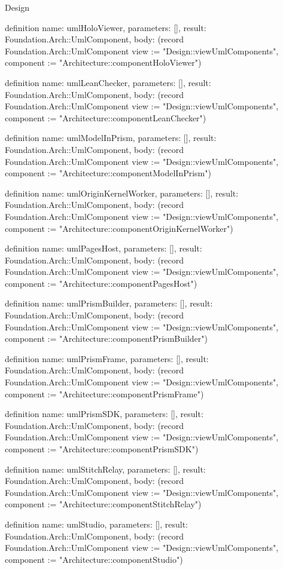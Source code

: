 \begin{lexlean}{Design}
\begin{semanticmodule}
definition{
  name: umlHoloViewer,
  parameters: [],
  result: Foundation.Arch::UmlComponent,
  body: (record Foundation.Arch::UmlComponent {view := "Design::viewUmlComponents", component := "Architecture::componentHoloViewer"})
}

definition{
  name: umlLeanChecker,
  parameters: [],
  result: Foundation.Arch::UmlComponent,
  body: (record Foundation.Arch::UmlComponent {view := "Design::viewUmlComponents", component := "Architecture::componentLeanChecker"})
}

definition{
  name: umlModelInPrism,
  parameters: [],
  result: Foundation.Arch::UmlComponent,
  body: (record Foundation.Arch::UmlComponent {view := "Design::viewUmlComponents", component := "Architecture::componentModelInPrism"})
}

definition{
  name: umlOriginKernelWorker,
  parameters: [],
  result: Foundation.Arch::UmlComponent,
  body: (record Foundation.Arch::UmlComponent {view := "Design::viewUmlComponents", component := "Architecture::componentOriginKernelWorker"})
}

definition{
  name: umlPagesHost,
  parameters: [],
  result: Foundation.Arch::UmlComponent,
  body: (record Foundation.Arch::UmlComponent {view := "Design::viewUmlComponents", component := "Architecture::componentPagesHost"})
}

definition{
  name: umlPrismBuilder,
  parameters: [],
  result: Foundation.Arch::UmlComponent,
  body: (record Foundation.Arch::UmlComponent {view := "Design::viewUmlComponents", component := "Architecture::componentPrismBuilder"})
}

definition{
  name: umlPrismFrame,
  parameters: [],
  result: Foundation.Arch::UmlComponent,
  body: (record Foundation.Arch::UmlComponent {view := "Design::viewUmlComponents", component := "Architecture::componentPrismFrame"})
}

definition{
  name: umlPrismSDK,
  parameters: [],
  result: Foundation.Arch::UmlComponent,
  body: (record Foundation.Arch::UmlComponent {view := "Design::viewUmlComponents", component := "Architecture::componentPrismSDK"})
}

definition{
  name: umlStitchRelay,
  parameters: [],
  result: Foundation.Arch::UmlComponent,
  body: (record Foundation.Arch::UmlComponent {view := "Design::viewUmlComponents", component := "Architecture::componentStitchRelay"})
}

definition{
  name: umlStudio,
  parameters: [],
  result: Foundation.Arch::UmlComponent,
  body: (record Foundation.Arch::UmlComponent {view := "Design::viewUmlComponents", component := "Architecture::componentStudio"})
}


\end{semanticmodule}
\end{lexlean}
